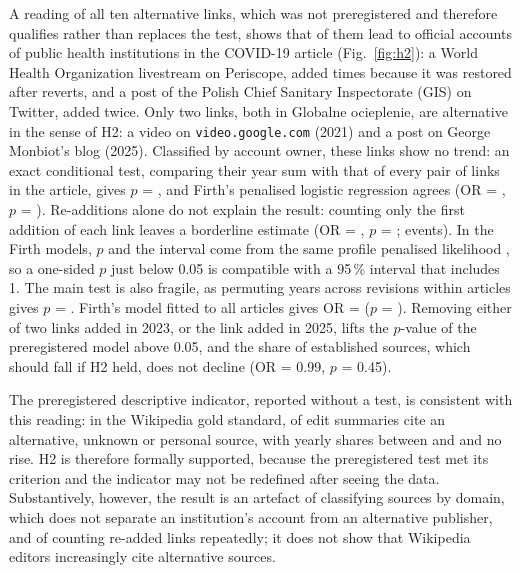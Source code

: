 \documentclass[10pt,a4paper]{article}
\newcommand{\kod}[1]{\texttt{#1}}
\begin{document}
A reading of all ten alternative links, which was not preregistered and therefore qualifies
rather than replaces the test, shows that \resHtwoOfficialLinks{} of them lead to official
accounts of public health institutions in the COVID-19 article (Fig.~\ref{fig:h2}): a World
Health Organization livestream on Periscope, added \resHtwoWhoRepeats{} times because it
was restored after reverts, and a post of the Polish Chief Sanitary Inspectorate (GIS) on
Twitter, added twice. Only two links, both in Globalne ocieplenie, are alternative in the
sense of H2: a video on \kod{video.google.com} (2021) and a post on George Monbiot's blog
(2025). Classified by account owner, these \resHtwoByOwnerLinks{} links show no trend: an
exact conditional test, comparing their year sum with that of every pair of links in the
article, gives $p$ = \resHtwoExactP, and Firth's penalised logistic regression
\cite{firth1993} agrees (OR = \resHtwoOwnerOr, $p$ = \resHtwoOwnerP). Re-additions alone
do not explain the result: counting only the first addition of each link leaves a
borderline estimate (OR = \resHtwoFirstOr, $p$ = \resHtwoFirstP; \resHtwoFirstEvents{}
events). In the Firth models, $p$ and the interval come from the same profile penalised
likelihood \cite{heinze2002}, so a one-sided $p$ just below 0.05 is compatible with a
95\,\% interval that includes 1. The main test is also fragile, as permuting years across
revisions within articles gives $p$ = \resHtwoPermutationP.
Firth's model fitted to all articles gives OR = \resHtwoFirthOr{} ($p$ = \resHtwoFirthP).
Removing either of two links added in 2023, or the link added in 2025, lifts the $p$-value
of the preregistered model above 0.05, and the share of established sources, which should
fall if H2 held, does not decline (OR = 0.99, $p$ = 0.45).

The preregistered descriptive indicator, reported without a test, is consistent with this
reading: in the Wikipedia gold standard, \resHtwoGoldShare{} of \resHtwoGoldUnits{} edit
summaries cite an alternative, unknown or personal source, with yearly shares between
\resHtwoGoldShareMin{} and \resHtwoGoldShareMax{} and no rise. H2 is therefore formally
supported, because the preregistered test met its criterion and the indicator may not be
redefined after seeing the data. Substantively, however, the result is an artefact of
classifying sources by domain, which does not separate an institution's account from an
alternative publisher, and of counting re-added links repeatedly; it does not show that
Wikipedia editors increasingly cite alternative sources.
\end{document}
